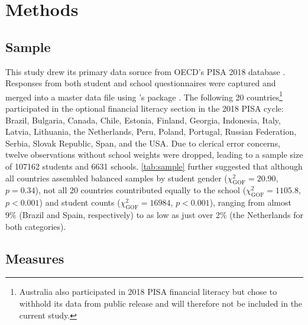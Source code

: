 \documentclass[a4paper,11pt,UKenglish,twoside,openright]{report}\usepackage[]{graphicx}\usepackage[]{color}
\begin{document}
\newpage



\newpage



\newpage



\newpage




\chapter{Methods}
\label{chp:3}

\section{Sample}

This study drew its primary data soruce from OECD's PISA 2018 database \parencite{FLdata}. Responses from both student and school questionnaires were captured and merged into a master data file using \CR's \parencite[Version 4.0.4,][]{R}  package \parencite[Version 2.5,][]{intsvy}. The following 20 countries\footnote{Australia also participated in 2018 PISA financial literacy but chose to withhold its data from public release and will therefore not be included in the current study.} participated in the optional financial literacy section in the 2018 PISA cycle: Brazil, Bulgaria, Canada, Chile, Estonia, Finland, Georgia, Indonesia, Italy, Latvia, Lithuania, the Netherlands, Peru, Poland, Portugal, Russian Federation, Serbia, Slovak Republic, Span, and the USA. Due to clerical error concerns, twelve observations without school weights were dropped, leading to a sample size of 107162 students and 6631 schools. \cref{tab:sample} further suggested that although all countries assembled balanced samples by student gender ($\chi^2_{\text{GOF}}=20.90$, $p=0.34$), not all 20 countries countributed equally to the school ($\chi^2_{\text{GOF}}=1105.8$, $p<0.001$) and student counts ($\chi^2_{\text{GOF}}=16984$, $p<0.001$), ranging from almost 9\% (Brazil and Spain, respectively) to as low as just over 2\% (the Netherlands for both categories).

\section{Measures}
\end{document}
